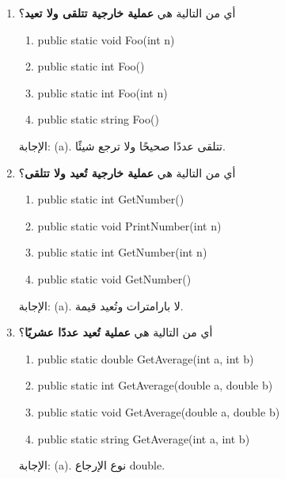 \documentclass[14pt]{extarticle}
\begin{document}
\begin{enumerate}[itemsep=1.8em]
\clearpage
\item
أي من التالية هي \textbf{عملية خارجية تتلقى ولا تعيد}؟
\begin{english}
\begin{enumerate}[label=(\alph*)]
    \item public static void Foo(int n)
    \item public static int Foo()
    \item public static int Foo(int n)
    \item public static string Foo()
\end{enumerate}
\end{english}
\ifwithsols
\begin{boxSolution}
الإجابة: (a).
تتلقى عددًا صحيحًا ولا ترجع شيئًا.
\end{boxSolution}
\fi


\item
أي من التالية هي \textbf{عملية خارجية تُعيد ولا تتلقى}؟
\begin{english}
\begin{enumerate}[label=(\alph*)]
    \item public static int GetNumber()
    \item public static void PrintNumber(int n)
    \item public static int GetNumber(int n)
    \item public static void GetNumber()
\end{enumerate}
\end{english}
\ifwithsols
\begin{boxSolution}
الإجابة: (a).
لا بارامترات وتُعيد قيمة.
\end{boxSolution}
\fi


\item
أي من التالية هي \textbf{عملية تُعيد عددًا عشريًا}؟
\begin{english}
\begin{enumerate}[label=(\alph*)]
    \item public static double GetAverage(int a, int b)
    \item public static int GetAverage(double a, double b)
    \item public static void GetAverage(double a, double b)
    \item public static string GetAverage(int a, int b)
\end{enumerate}
\end{english}
\ifwithsols
\begin{boxSolution}
الإجابة: (a).
نوع الإرجاع \textenglish{double}.
\end{boxSolution}
\fi


\end{enumerate}
\end{document}
